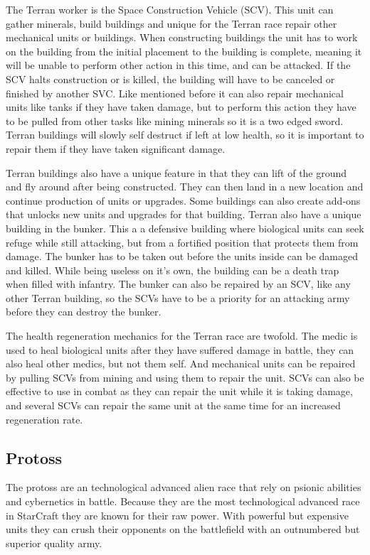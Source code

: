The Terran worker is the Space Construction Vehicle (SCV). This unit can gather minerals, build buildings and unique for the Terran race repair other mechanical units or buildings. When constructing buildings the unit has to work on the building from the initial placement to the building is complete, meaning it will be unable to perform other action in this time, and can be attacked. If the SCV halts construction or is killed, the building will have to be canceled or finished by another SVC. Like mentioned before it can also repair mechanical units like tanks if they have taken damage, but to perform this action they have to be pulled from other tasks like mining minerals so it is a two edged sword. Terran buildings will slowly self destruct if left at low health, so it is important to repair them if they have taken significant damage. 

Terran buildings also have a unique feature in that they can lift of the ground and fly around after being constructed. They can then land in a new location and continue production of units or upgrades. Some buildings can also create add-ons that unlocks new units and upgrades for that building. Terran also have a unique building in the bunker. This a a defensive building where  biological units can seek refuge while still attacking, but from a fortified position that protects them from damage. The bunker has to be taken out before the units inside can be damaged and killed. While being useless on it's own, the building can be a death trap when filled with infantry. The bunker can also be repaired by an SCV, like any other Terran building, so the SCVs have to be a priority for an attacking army before they can destroy the bunker. 

The health regeneration mechanics for the Terran race are twofold. The medic is used to heal biological units after they have suffered damage in battle, they can also heal other medics, but not them self. And mechanical units can be repaired by pulling SCVs from mining and using them to repair the unit. SCVs can also be effective to use in combat as they can repair the unit while it is taking damage, and several SCVs can repair the same unit at the same time for an increased regeneration rate. 

\subsection{Protoss}
The protoss are an technological advanced alien race that rely on psionic abilities and cybernetics in battle. Because they are the most technological advanced race in StarCraft they are known for their raw power. With powerful but expensive units they can crush their opponents on the battlefield with an outnumbered but superior quality army.

